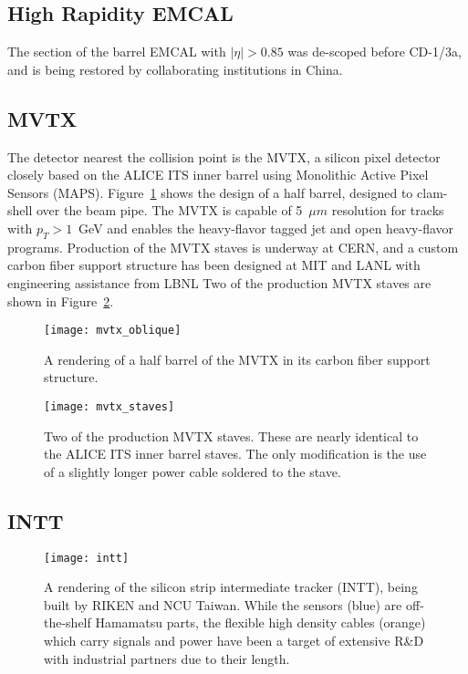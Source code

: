 \subsection{High Rapidity EMCAL} 

The section of the barrel EMCAL with $|\eta|>0.85$ was de-scoped before
CD-1/3a, and is being restored by collaborating institutions in China.

\subsection{MVTX}

The detector nearest the collision point is the MVTX, a silicon pixel
detector closely based on the ALICE ITS inner barrel using Monolithic Active Pixel Sensors (MAPS). 
Figure~\ref{fig:mvtx_oblique} shows the design of a half barrel, designed
to clam-shell over the beam pipe.  
The MVTX is capable of 5~$\mu m$ resolution for
tracks with $p_T > 1$~GeV and enables the heavy-flavor tagged jet
and open heavy-flavor programs.  
Production of the MVTX staves is
underway at CERN, and a custom carbon fiber support structure
has been designed at MIT and LANL with engineering assistance from LBNL
Two of the production MVTX staves are shown in Figure~\ref{fig:mvtx_staves}.

\begin{figure}[hbt!]
  \centering
  \texttt{[image: mvtx\_oblique]}
  \caption{A rendering of a half barrel of the MVTX in its carbon
    fiber support structure.}
  \label{fig:mvtx_oblique}
\end{figure}

\begin{figure}[hbt!]
  \centering
  \texttt{[image: mvtx\_staves]}
  \caption{Two of the production MVTX staves.  These are nearly
    identical to the ALICE ITS inner barrel staves.  The only
    modification is the use of a slightly longer power cable soldered
    to the stave.}
  \label{fig:mvtx_staves}
\end{figure}

\subsection{INTT}

\begin{figure}[hbt!]
  \centering
  \texttt{[image: intt]}
  \caption{A rendering of the silicon strip intermediate tracker
    (INTT), being built by RIKEN and NCU Taiwan.  While the sensors
    (blue) are off-the-shelf Hamamatsu parts, the flexible high
    density cables (orange) which carry signals and power have been a
    target of extensive R\&D with industrial partners due to their
    length.}
  \label{fig:intt}
\end{figure}


